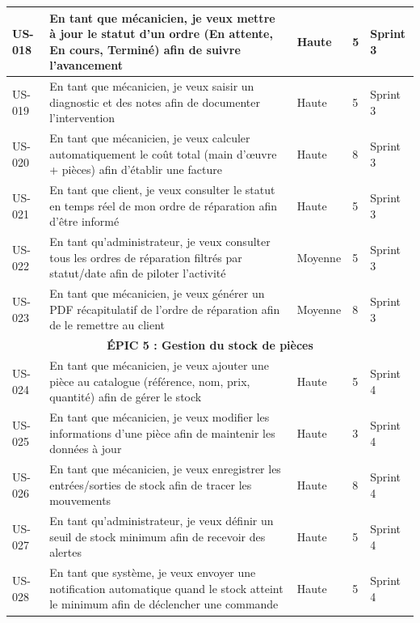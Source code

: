 \begin{longtable}{|p{1cm}|p{5.5cm}|p{1.8cm}|p{1.5cm}|p{1.5cm}|}
US-018 & En tant que mécanicien, je veux mettre à jour le statut d'un ordre (En attente, En cours, Terminé) afin de suivre l'avancement & Haute & 5 & Sprint 3 \\
\hline

US-019 & En tant que mécanicien, je veux saisir un diagnostic et des notes afin de documenter l'intervention & Haute & 5 & Sprint 3 \\
\hline

US-020 & En tant que mécanicien, je veux calculer automatiquement le coût total (main d'œuvre + pièces) afin d'établir une facture & Haute & 8 & Sprint 3 \\
\hline

US-021 & En tant que client, je veux consulter le statut en temps réel de mon ordre de réparation afin d'être informé & Haute & 5 & Sprint 3 \\
\hline

US-022 & En tant qu'administrateur, je veux consulter tous les ordres de réparation filtrés par statut/date afin de piloter l'activité & Moyenne & 5 & Sprint 3 \\
\hline

US-023 & En tant que mécanicien, je veux générer un PDF récapitulatif de l'ordre de réparation afin de le remettre au client & Moyenne & 8 & Sprint 3 \\
\hline

\multicolumn{5}{|c|}{\cellcolor{gray!20}\textbf{ÉPIC 5 : Gestion du stock de pièces}} \\
\hline

US-024 & En tant que mécanicien, je veux ajouter une pièce au catalogue (référence, nom, prix, quantité) afin de gérer le stock & Haute & 5 & Sprint 4 \\
\hline

US-025 & En tant que mécanicien, je veux modifier les informations d'une pièce afin de maintenir les données à jour & Haute & 3 & Sprint 4 \\
\hline

US-026 & En tant que mécanicien, je veux enregistrer les entrées/sorties de stock afin de tracer les mouvements & Haute & 8 & Sprint 4 \\
\hline

US-027 & En tant qu'administrateur, je veux définir un seuil de stock minimum afin de recevoir des alertes & Haute & 5 & Sprint 4 \\
\hline

US-028 & En tant que système, je veux envoyer une notification automatique quand le stock atteint le minimum afin de déclencher une commande & Haute & 5 & Sprint 4 \\
\hline


\end{longtable}
